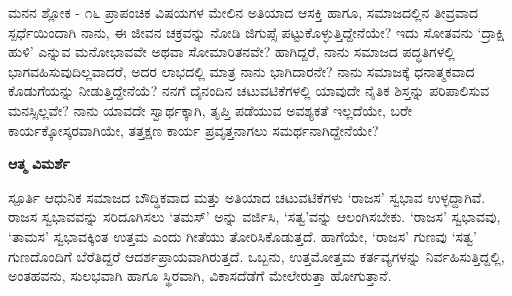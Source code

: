\begin{mananam}{\mananamfont ಮನನ ಶ್ಲೋಕ - ೧೬}
\mananamtext
ಪ್ರಾಪಂಚಿಕ ವಿಷಯಗಳ ಮೇಲಿನ ಅತಿಯಾದ ಆಸಕ್ತಿ ಹಾಗೂ, ಸಮಾಜದಲ್ಲಿನ ತೀವ್ರವಾದ ಸ್ಪರ್ಧೆಯಿಂದಾಗಿ ನಾನು, ಈ ಜೀವನ ಚಕ್ರವನ್ನು ನೋಡಿ ಜಿಗುಪ್ಸೆ ಪಟ್ಟುಕೊಳ್ಳುತ್ತಿದ್ದೇನೆಯೇ? ಇದು ಸೋತವನು ‘ದ್ರಾಕ್ಷಿ ಹುಳಿ’ ಎನ್ನುವ ಮನೋಭಾವವೇ ಅಥವಾ ಸೋಮಾರಿತನವೇ? ಹಾಗಿದ್ದರೆ, ನಾನು ಸಮಾಜದ ಪದ್ಧತಿಗಳಲ್ಲಿ ಭಾಗವಹಿಸುವುದಿಲ್ಲವಾದರೆ, ಅದರ ಲಾಭದಲ್ಲಿ ಮಾತ್ರ ನಾನು ಭಾಗಿದಾರನೇ?  ನಾನು ಸಮಾಜಕ್ಕೆ ಧನಾತ್ಮಕವಾದ ಕೊಡುಗೆಯನ್ನು ನೀಡುತ್ತಿದ್ದೇನೆಯೆ? ನನಗೆ ದೈನಂದಿನ ಚಟುವಟಿಕೆಗಳಲ್ಲಿ ಯಾವುದೇ ನೈತಿಕ ಶಿಸ್ತನ್ನು ಪರಿಪಾಲಿಸುವ ಮನಸ್ಸಿಲ್ಲವೇ? ನಾನು ಯಾವದೇ ಸ್ವಾರ್ಥಕ್ಕಾಗಿ, ತೃಪ್ತಿ ಪಡೆಯುವ ಅವಶ್ಯಕತೆ ಇಲ್ಲದೆಯೇ,  ಬರೇ ಕಾರ್ಯಕ್ಕೋಸ್ಕರವಾಗಿಯೇ, ತತ್ತಕ್ಷಣ ಕಾರ್ಯ ಪ್ರವೃತ್ತನಾಗಲು ಸಮರ್ಥನಾಗಿದ್ದೇನೆಯೇ?
\end{mananam}
\WritingHand\enspace\textbf{ಆತ್ಮ ವಿಮರ್ಶೆ}\\
\begin{inspiration}{\mananamfont ಸ್ಪೂರ್ತಿ}
\mananamtext ಆಧುನಿಕ ಸಮಾಜದ ಬೌದ್ಧಿಕವಾದ ಮತ್ತು ಅತಿಯಾದ ಚಟುವಟಿಕೆಗಳು ‘ರಾಜಸ’ ಸ್ವಭಾವ ಉಳ್ಳದ್ದಾಗಿವೆ. ರಾಜಸ ಸ್ವಭಾವವನ್ನು ಸರಿದೂಗಿಸಲು ‘ತಮಸ್’ ಅನ್ನು ವರ್ಜಿಸಿ, ‘ಸತ್ವ’ವನ್ನು ಆಲಂಗಿಸಬೇಕು. ‘ರಾಜಸ’ ಸ್ವಭಾವವು, ‘ತಾಮಸ’ ಸ್ವಭಾವಕ್ಕಿಂತ ಉತ್ತಮ ಎಂದು ಗೀತೆಯು ತೋರಿಸಿಕೊಡುತ್ತದೆ. ಹಾಗೆಯೇ, ‘ರಾಜಸ’ ಗುಣವು ‘ಸತ್ವ’ ಗುಣದೊಂದಿಗೆ ಬೆರೆತಿದ್ದರೆ ಆದರ್ಶಪ್ರಾಯವಾಗಿರುತ್ತದೆ. ಒಬ್ಬನು, ಉತ್ತಮೋತ್ತಮ ಕರ್ತವ್ಯಗಳನ್ನು ನಿರ್ವಹಿಸುತ್ತಿದ್ದಲ್ಲಿ, ಅಂತಹವನು, ಸುಲಭವಾಗಿ ಹಾಗೂ ಸ್ಥಿರವಾಗಿ, ವಿಕಾಸದೆಡೆಗೆ ಮೇಲೇರುತ್ತಾ ಹೋಗುತ್ತಾನೆ.
\end{inspiration}
\newpage

